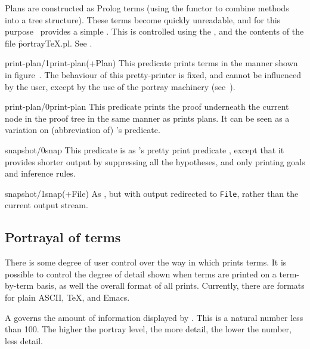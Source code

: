 Plans are constructed as Prolog terms (using the  functor to
combine methods into a tree structure). These terms become quickly
unreadable, and for this purpose \clam\ provides a simple
. This is controlled using the ,
 and the contents of the file \f{portrayTeX.pl}.
See .

\begin{predicate}{print-plan/1}{print-plan(+Plan)}%
This predicate prints terms in the manner shown in
figure~. The behaviour of this pretty-printer is
fixed, and cannot be influenced by the user, except by the use of
the portray machinery (see~).
\end{predicate}

\begin{predicate}{print-plan/0}{print-plan}%
This predicate prints the proof underneath the current node in the
proof tree in the same manner as  prints plans. It can
be seen as a variation on (abbreviation of) \oyster's 
predicate.
\end{predicate}

\begin{predicate}{snapshot/0}{snap}%
This predicate is as \oyster's pretty print predicate , except
that it provides shorter output by suppressing all the hypotheses, and
only printing goals and inference rules.
\end{predicate}

\begin{predicate}{snapshot/1}{snap(+File)}%
As , but with output redirected to {\tt File}, rather than
the current output stream.
\end{predicate}



\subsection {Portrayal of terms}
\label{sec:portrayal}
There is some degree of user control over the way in which \clam
prints terms.  It is possible to control the degree of detail shown
when terms are printed on a term-by-term basis, as well the overall
format of all prints.  Currently, there are formats for plain ASCII,
\TeX,  and Emacs.

A {\em {}\/} governs the amount of information
displayed by \clam.  This is a natural number less than 100.  The
higher the portray level, the more detail, the lower the number, less
detail.

